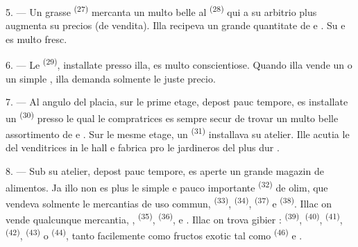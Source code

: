 5. --- Un grasse  \textsuperscript{(27)} mercanta un multo belle
 al  \textsuperscript{(28)} qui a su
arbitrio plus augmenta su precios (de vendita). Illa recipeva un grande quantitate
de  e . Su  e
 es multo fresc.

\VUsaut{4.0mm}
\VUsaut{3.0mm}

6. --- Le  \textsuperscript{(29)}, installate presso
illa, es multo conscientiose. Quando illa vende un  o un simple , illa demanda solmente le juste
precio.

7. --- Al angulo del placia, sur le prime etage, depost pauc tempore, es
installate un  \textsuperscript{(30)} presso le qual
le compratrices es sempre secur de trovar un multo belle assortimento de
 e . Sur le mesme
etage, un  \textsuperscript{(31)} installava su atelier. Ille
acutia le  del venditrices in le hall e fabrica pro le
jardineros  del plus dur .

\VUsaut{4.0mm}
\VUsaut{3.0mm}

8. --- Sub su atelier, depost pauc tempore, es aperte un grande magazin de
alimentos. Ja illo non es plus le simple e pauco importante 
\textsuperscript{(32)} de olim, que vendeva solmente le mercantias de uso commun,
 \textsuperscript{(33)},  \textsuperscript{(34)},
 \textsuperscript{(37)} e 
\textsuperscript{(38)}. Illac on vende qualcunque mercantia, ,  \textsuperscript{(35)}, 
\textsuperscript{(36)},  e
. Illac on trova gibier : 
\textsuperscript{(39)},  \textsuperscript{(40)},
 \textsuperscript{(41)}, 
\textsuperscript{(42)},  \textsuperscript{(43)} o
 \textsuperscript{(44)}, tanto facilemente como fructos exotic
tal como  \textsuperscript{(46)} e .

